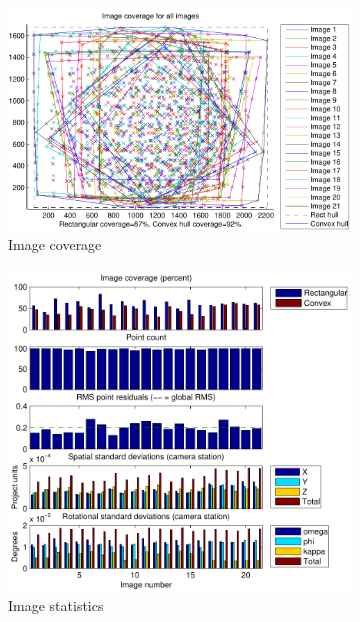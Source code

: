 \documentclass{article}
\begin{document}
\begin{figure}
  \centering
  \begin{subfigure}[b]{0.3\textwidth}
    \includegraphics[width=\textwidth]{ill/ccamcoverage}
    \caption{Image coverage}
    \label{fig:ccamCoverage}
  \end{subfigure}%
  \begin{subfigure}[b]{0.3\textwidth}
    \includegraphics[width=\textwidth]{ill/ccamimstats}
    \caption{Image statistics}
    \label{fig:ccamImstats}
  \end{subfigure}
  \begin{subfigure}[b]{0.3\textwidth}

\end{subfigure}
\end{figure}
\end{document}
